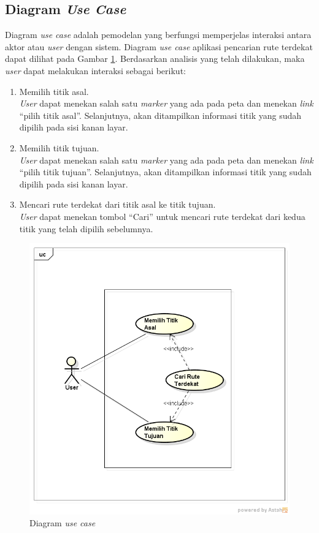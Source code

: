 \subsection{Diagram \textit{Use Case}}
Diagram \textit{use case} adalah pemodelan yang berfungsi memperjelas interaksi
antara aktor atau \textit{user} dengan sistem. 
Diagram \textit{use case} aplikasi pencarian rute terdekat dapat dilihat pada
Gambar \ref{fig:usecase}.
Berdasarkan analisis yang telah dilakukan, maka \textit{user} dapat melakukan
interaksi sebagai berikut:
\begin{enumerate}
  \item Memilih titik asal.\\
  \textit{User} dapat menekan salah satu \textit{marker} yang ada pada peta dan
  menekan \textit{link} ``pilih titik asal''. Selanjutnya, akan ditampilkan
  informasi titik yang sudah dipilih pada sisi kanan layar.
  
  \item Memilih titik tujuan.\\
  \textit{User} dapat menekan salah satu \textit{marker} yang ada pada peta dan
  menekan \textit{link} ``pilih titik tujuan''. Selanjutnya, akan ditampilkan
  informasi titik yang sudah dipilih pada sisi kanan layar.
  
  \item Mencari rute terdekat dari titik asal ke titik tujuan.\\
  \textit{User} dapat menekan tombol ``Cari'' untuk mencari rute terdekat dari
  kedua titik yang telah dipilih sebelumnya.
\end{enumerate}
\begin{figure}[h]
\centering
\includegraphics[scale=0.65]{Gambar/usecase}
\caption[Diagram Use Case]{Diagram \textit{use case}}
\label{fig:usecase}
\end{figure}

